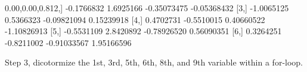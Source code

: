 \documentclass[
]{article}
\newenvironment{Shaded}{\begin{snugshade}}{\end{snugshade}}
\newcommand{\DecValTok}[1]{\textcolor[rgb]{0.00,0.00,0.81}{#1}}
\newcommand{\FloatTok}[1]{\textcolor[rgb]{0.00,0.00,0.81}{#1}}
\newcommand{\NormalTok}[1]{#1}
\newcommand{\SpecialCharTok}[1]{\textcolor[rgb]{0.00,0.00,0.00}{#1}}
\begin{document}
\begin{Shaded}
\begin{Highlighting}[]
\NormalTok{[}\DecValTok{2}\NormalTok{,] }\SpecialCharTok{{-}}\FloatTok{0.1766832}  \FloatTok{1.6925166} \SpecialCharTok{{-}}\FloatTok{0.35073475} \SpecialCharTok{{-}}\FloatTok{0.05368432}
\NormalTok{[}\DecValTok{3}\NormalTok{,] }\SpecialCharTok{{-}}\FloatTok{1.0065125}  \FloatTok{0.5366323} \SpecialCharTok{{-}}\FloatTok{0.09821094}  \FloatTok{0.15239918}
\NormalTok{[}\DecValTok{4}\NormalTok{,]  }\FloatTok{0.4702731} \SpecialCharTok{{-}}\FloatTok{0.5510015}  \FloatTok{0.40660522} \SpecialCharTok{{-}}\FloatTok{1.10826913}
\NormalTok{[}\DecValTok{5}\NormalTok{,] }\SpecialCharTok{{-}}\FloatTok{0.5531109}  \FloatTok{2.8420892} \SpecialCharTok{{-}}\FloatTok{0.78926520}  \FloatTok{0.56090351}
\NormalTok{[}\DecValTok{6}\NormalTok{,]  }\FloatTok{0.3264251} \SpecialCharTok{{-}}\FloatTok{0.8211002} \SpecialCharTok{{-}}\FloatTok{0.91033567}  \FloatTok{1.95166596}
\end{Highlighting}
\end{Shaded}

Step 3, dicotormize the 1st, 3rd, 5th, 6th, 8th, and 9th variable within
a for-loop.
\end{document}
